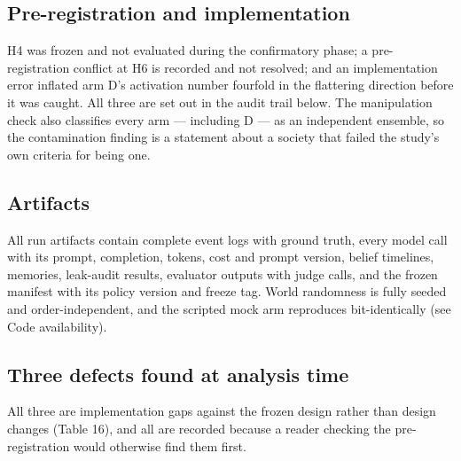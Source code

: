 \documentclass[pdflatex,sn-basic]{sn-jnl}
\begin{document}
\hypertarget{pre-registration-and-implementation}{%
\subsection{Pre-registration and implementation}\label{pre-registration-and-implementation}}

H4 was frozen and not evaluated during the
confirmatory phase; a pre-registration conflict at H6 is recorded and not resolved; and an
implementation error inflated arm D's activation number fourfold in the flattering
direction before it was caught. All three are set out in the audit trail below. The
manipulation check also classifies every arm --- including D --- as an independent ensemble,
so the contamination finding is a statement about a society that failed the study's own
criteria for being one.

\hypertarget{artifacts}{%
\subsection{Artifacts}\label{artifacts}}

All run artifacts contain complete event logs with ground truth, every
model call with its prompt, completion, tokens, cost and prompt version, belief timelines,
memories, leak-audit results, evaluator outputs with judge calls, and the frozen manifest
with its policy version and freeze tag. World randomness is fully seeded and order-independent, and the scripted mock arm
reproduces bit-identically (see Code availability).

\hypertarget{three-defects-found-at-analysis-time}{%
\subsection{Three defects found at analysis time}\label{three-defects-found-at-analysis-time}}

All three are implementation gaps against the frozen
design rather than design changes (Table 16), and all are recorded because a reader checking
the pre-registration would otherwise find them first.
\end{document}
